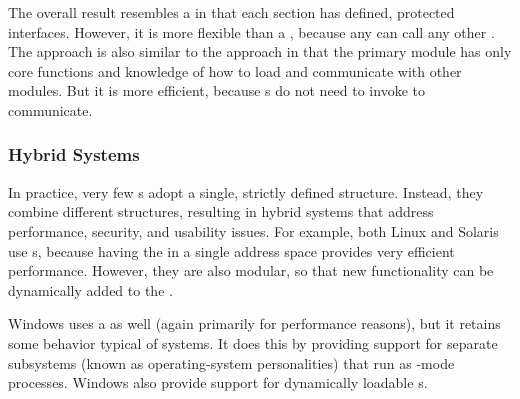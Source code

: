 The overall result resembles a  in that each  section has defined, protected interfaces.
However, it is more flexible than a , because any  can call any other .
The approach is also similar to the  approach in that the primary module has only core functions and knowledge of how to load and communicate with other modules.
But it is more efficient, because s do not need to invoke  to communicate.

\subsubsection{Hybrid Systems}\label{subsubsec:Hybrid_Systems}
In practice, very few s adopt a single, strictly defined structure.
Instead, they combine different structures, resulting in hybrid systems that address performance, security, and usability issues.
For example, both Linux and Solaris use s, because having the  in a single address space provides very efficient performance.
However, they are also modular, so that new functionality can be dynamically added to the .

Windows uses a  as well (again primarily for performance reasons), but it retains some behavior typical of  systems.
It does this by providing support for separate subsystems (known as operating-system personalities) that run as -mode processes.
Windows also provide support for dynamically loadable s.

